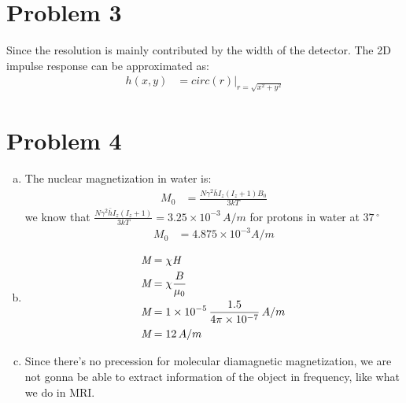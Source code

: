 \documentclass[12pt]{article}
\begin{document}
\section*{Problem 3}
Since the resolution is mainly contributed by the width of the detector. The 2D impulse response can be approximated as:
\begin{align*}
h(x,y) &= circ(r)|_{r =\sqrt{x^2+y^2}}
\end{align*}

\section*{Problem 4}
\begin{enumerate}[a)]
\item The nuclear magnetization in water is:
\begin{align*}
M_0 &= \frac{N \gamma^2 \bar{h} I_z(I_z + 1) B_0}{3kT}
\end{align*}
we know that $\frac{N \gamma^2 \bar{h} I_z(I_z + 1) }{3kT} = 3.25 \times 10^{-3} \, A/m$ for protons in water at $37\,^{\circ}$
\begin{align*}
M_0 &= 4.875 \times 10^{-3} A/m
\end{align*}

\item 
\begin{align*}
\emph{M} &= \chi \emph{H}
\\\emph{M} &= \chi \frac{B}{\mu_0}
\\\emph{M} &= 1\times10^{-5} \, \frac{1.5}{4\pi \times 10^{-7}} \,A/m
\\\emph{M} &= 12 \,A/m
\end{align*}

\item Since there's no precession for molecular diamagnetic magnetization, we are not gonna be able to extract information of the object in frequency, like what we do in MRI.

\end{enumerate}
		
\end{document}
